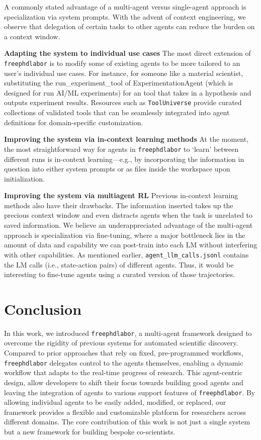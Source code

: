 \documentclass{article}
\begin{document}
A commonly stated advantage of a multi-agent versus single-agent approach is specialization via system prompts. With the advent of context engineering, we observe that delegation of certain tasks to other agents can reduce the burden on a context window.

\textbf{Adapting the system to individual use cases}
The most direct extension of \texttt{freephdlabor} is to modify some of existing agents to be more tailored to an user's individual use cases. For instance, for someone like a material scientist, substituting the run\_experiment\_tool of ExperimentationAgent (which is designed for run AI/ML experiments) for an tool that takes in a hypothesis and outputs experiment results. Resources such as \texttt{ToolUniverse} \cite{gao2025democratizingaiscientistsusing} provide curated collections of validated tools that can be seamlessly integrated into agent definitions for domain-specific customization.\par

\textbf{Improving the system via in-context learning methods}
At the moment, the most straightforward way for agents in \texttt{freephdlabor} to `learn' between different runs is in-context learning---e.g., by incorporating the information in question into either system prompts or as files inside the workspace upon initialization. 

\textbf{Improving the system via multiagent RL}
Previous in-context learning methods also have their drawbacks. The information inserted takes up the precious context window and even distracts agents when the task is unrelated to saved information. We believe an underappreciated advantage of the multi-agent approach is specialization via fine-tuning, where a major bottleneck lies in the amount of data and capability we can post-train into each LM without interfering with other capabilities. As mentioned earlier, \texttt{agent\_llm\_calls.jsonl} contains the LM calls (i.e., state-action pairs) of different agents. Thus, it would be interesting to fine-tune agents using a curated version of those trajectories.




\section{Conclusion}
\label{sec:conclusion}
In this work, we introduced \texttt{freephdlabor}, a multi-agent framework designed to overcome the rigidity of previous systems for automated scientific discovery. Compared to prior approaches that rely on fixed, pre-programmed workflows, \texttt{freephdlabor} delegates control to the agents themselves, enabling a dynamic workflow that adapts to the real-time progress of research. This agent-centric design, allow developers to shift their focus towards building good agents and leaving the integration of agents to various support features of \texttt{freephdlabor}. By allowing individual agents to be easily added, modified, or replaced, our framework provides a flexible and customizable platform for researchers across different domains. The core contribution of this work is not just a single system but a new framework for building bespoke co-scientists. 
\end{document}
